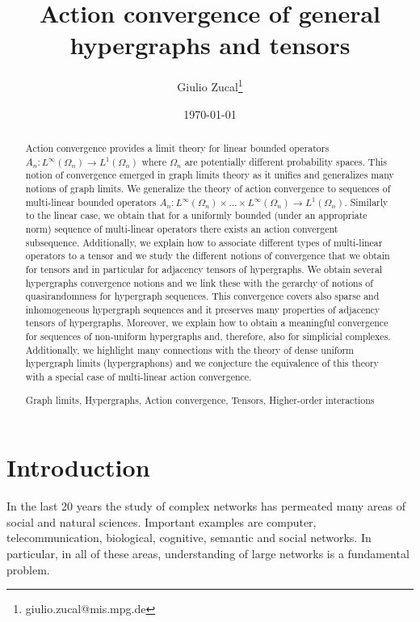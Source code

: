 \documentclass[11pt]{article}
\title{Action convergence of general hypergraphs and tensors}
\author{Giulio Zucal\thanks{giulio.zucal@mis.mpg.de}}
\affil[1]{Max Planck Institute for Mathematics in the Sciences, Leipzig, Germany}
\date{\today}
\begin{document}
\maketitle

\begin{abstract}


Action convergence provides a limit theory for linear bounded operators $A_n:L^{\infty}(\Omega_n)\longrightarrow L^1(\Omega_n)$ where $\Omega_n$ are potentially different probability spaces. This notion of convergence emerged in graph limits theory as it unifies and generalizes many notions of graph limits. We generalize the theory of action convergence to sequences of multi-linear bounded operators $A_n:L^{\infty}(\Omega_n)\times \ldots \times L^{\infty}(\Omega_n)\longrightarrow L^1(\Omega_n)$. Similarly to the linear case, we obtain that for a uniformly bounded (under an appropriate norm) sequence of multi-linear operators there exists an action convergent subsequence. Additionally, we explain how to associate different types of multi-linear operators to a tensor and we study the different notions of convergence that we obtain for tensors and in particular for adjacency tensors of hypergraphs. We obtain several hypergraphs convergence notions and we link these with the gerarchy of notions of quasirandomness for hypergraph sequences. This convergence covers also sparse and inhomogeneous hypergraph sequences and it preserves many properties of adjacency tensors of hypergraphs. Moreover, we explain how to obtain a meaningful convergence for sequences of non-uniform hypergraphs and, therefore, also for simplicial complexes. Additionally, we highlight many connections with the theory of  dense uniform hypergraph limits (hypergraphons) and we conjecture the equivalence of this theory with a special case of multi-linear action convergence. 


    \vspace{0.2cm}
  Graph limits, Hypergraphs, Action convergence, Tensors, Higher-order interactions
\end{abstract}

\section{Introduction}


In the last 20 years the study of complex networks has permeated many areas of social and natural sciences. Important examples are computer, telecommunication, biological, cognitive, semantic and social networks. In particular, in all of these areas, understanding of large networks is a fundamental problem.
\end{document}
